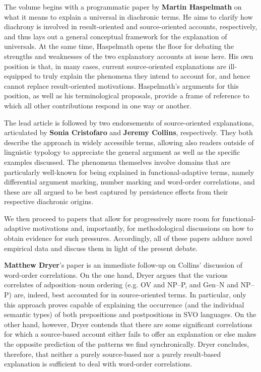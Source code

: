 \documentclass[output=paper]{langsci/langscibook}
\begin{document}
The volume begins with a programmatic paper by \textbf{Martin Haspelmath} on what it means to explain a universal in diachronic terms. He aims to clarify how diachrony is involved in result-oriented and source-oriented accounts, respectively, and thus lays out a general conceptual framework for the explanation of universals. At the same time, Haspelmath opens the floor for debating the strengths and weaknesses of the two explanatory accounts at issue here. His own position is that, in many cases, current source-oriented explanations are ill-equipped to truly explain the phenomena they intend to account for, and hence cannot replace result-oriented motivations. Haspelmath’s arguments for this position, as well as his terminological proposals, provide a frame of reference to which all other contributions respond in one way or another.

The lead article is followed by two endorsements of source-oriented explanations, articulated by \textbf{Sonia Cristofaro} and \textbf{Jeremy Collins}, respectively. They both describe the approach in widely accessible terms, allowing also readers outside of linguistic typology to appreciate the general argument as well as the specific examples discussed. The phenomena themselves involve domains that are particularly well-known for being explained in functional-adaptive terms, namely differential argument marking, number marking and word-order correlations, and these are all argued to be best captured by persistence effects from their respective diachronic origins.  

We then proceed to papers that allow for progressively more room for functional-adaptive motivations and, importantly, for methodological discussions on how to obtain evidence for such pressures. Accordingly, all of these papers adduce novel empirical data and discuss them in light of the present debate.

\textbf{Matthew Dryer}’s paper is an immediate follow-up on Collins’ discussion of word-order correlations. On the one hand, Dryer argues that the various correlates of adposition–noun ordering (e.g. OV and NP–P, and Gen–N and NP–P) are, indeed, best accounted for in source-oriented terms. In particular, only this approach proves capable of explaining the occurrence (and the individual semantic types) of both prepositions and postpositions in SVO languages. On the other hand, however, Dryer contends that there are some significant correlations for which a source-based account either fails to offer an explanation or else makes the opposite prediction of the patterns we find synchronically. Dryer concludes, therefore, that neither a purely source-based nor a purely result-based explanation is sufficient to deal with word-order correlations.      
\end{document}
